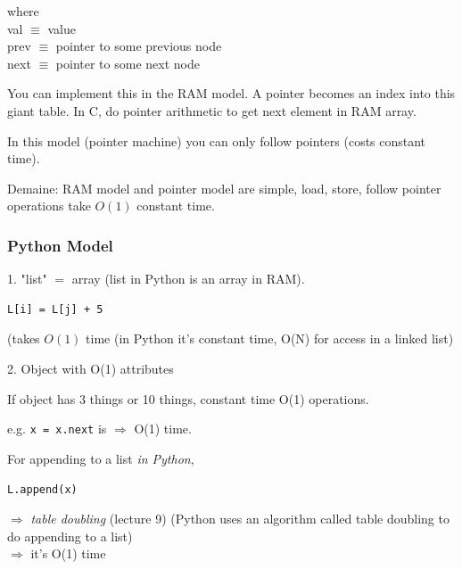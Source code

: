\documentclass[10pt]{amsart}
\begin{document}
\begin{multicols*}{2}
where \\
val $\equiv $ value \\
prev $\equiv $ pointer to some previous node \\
next $\equiv $ pointer to some next node \\




You can implement this in the RAM model. A pointer becomes an index into this giant table. In C, do pointer arithmetic to get next element in RAM array.

In this model (pointer machine) you can only follow pointers (costs constant time).

Demaine: RAM model and pointer model are simple, load, store, follow pointer operations take $O(1)$ constant time.

\subsubsection{Python Model}

1. "list" $=$ array (list in Python is an array in RAM).

\begin{verbatim}
L[i] = L[j] + 5	
\end{verbatim}
(takes $O(1)$ time (in Python it's constant time, O(N) for access in a linked list)

2. Object with O(1) attributes

If object has 3 things or 10 things, constant time O(1) operations.

e.g. \verb|x = x.next| is $\Longrightarrow$ O(1) time.

For appending to a list \emph{in Python},

\verb|L.append(x)|

$\Longrightarrow$ \emph{table doubling} (lecture 9) (Python uses an algorithm called table doubling to do appending to a list) \\
$\Longrightarrow$ it's O(1) time 


\end{multicols*}
\end{document}
